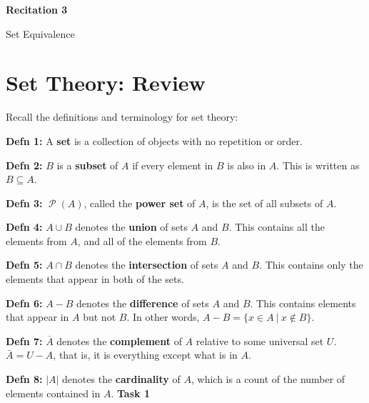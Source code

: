 \documentclass[12pt,letterpaper]{article}
\newcommand\Pow{\ensuremath{\operatorname{\mathcal{P}}}}
\begin{document}
  \thispagestyle{firstpagestyle}
  \begin{center}
    {\large \textbf{Recitation 3}}
    
    {\large Set Equivalence}

  \end{center}

\section*{Set Theory: Review}

Recall the definitions and terminology for set theory:

\textbf{Defn 1:} A \textbf{set} is a collection of objects with no repetition or order.

\textbf{Defn 2:} $B$ is a \textbf{subset} of $A$ if every element in $B$ is also in $A$. This is written as $B \subseteq A$.

\textbf{Defn 3:} $\Pow{(A)}$, called the \textbf{power set} of $A$, is the set of all subsets of $A$.

\textbf{Defn 4:} $A \cup B$ denotes the \textbf{union} of sets $A$ and $B$. This contains all the elements from $A$, and all of the elements from $B$. 
	
\textbf{Defn 5:} $A \cap B$ denotes the \textbf{intersection} of sets $A$ and $B$. This contains only the elements that appear in both of the sets.
	
\textbf{Defn 6:} $A - B$ denotes the \textbf{difference} of sets $A$ and $B$. This contains elements that appear in $A$ but not $B$. In other words, $A - B = \{x \in A \ | \ x \notin B\}$.
	
\textbf{Defn 7:} $\overline{A}$ denotes the \textbf{complement} of $A$ relative to some universal set $U$. $\bar{A} = U - A$, that is, it is everything except what is in $A$.
	
\textbf{Defn 8:} $|A|$ denotes the \textbf{cardinality} of $A$, which is a count of the number of elements contained in $A$.
\newpage
\textbf{Task 1}
\end{document}
